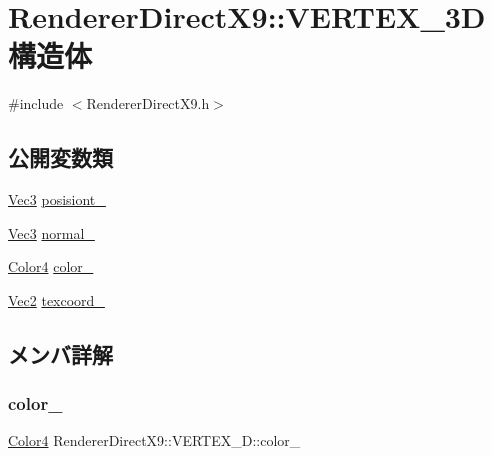 \hypertarget{struct_renderer_direct_x9_1_1_v_e_r_t_e_x__3_d}{}\section{Renderer\+Direct\+X9\+:\+:V\+E\+R\+T\+E\+X\+\_\+3D 構造体}
\label{struct_renderer_direct_x9_1_1_v_e_r_t_e_x__3_d}


{\ttfamily \#include $<$Renderer\+Direct\+X9.\+h$>$}

\subsection*{公開変数類}
\begin{DoxyCompactItemize}
\item 
\mbox{\hyperlink{_vector3_d_8h_ab16f59e4393f29a01ec8b9bbbabbe65d}{Vec3}} \mbox{\hyperlink{struct_renderer_direct_x9_1_1_v_e_r_t_e_x__3_d_a15e30709ae06aa5bc8e73054e9f160e9}{posisiont\+\_\+}}
\item 
\mbox{\hyperlink{_vector3_d_8h_ab16f59e4393f29a01ec8b9bbbabbe65d}{Vec3}} \mbox{\hyperlink{struct_renderer_direct_x9_1_1_v_e_r_t_e_x__3_d_a14a5a2f215062bb76fc69daa45160904}{normal\+\_\+}}
\item 
\mbox{\hyperlink{_vector3_d_8h_a9c2339f516cf07ce4753b8a99fab3791}{Color4}} \mbox{\hyperlink{struct_renderer_direct_x9_1_1_v_e_r_t_e_x__3_d_ac81f0059a82d7005a8bd3cfb189cb277}{color\+\_\+}}
\item 
\mbox{\hyperlink{_vector3_d_8h_a5ef6e95dfc5f9d3820b71772d99bbc25}{Vec2}} \mbox{\hyperlink{struct_renderer_direct_x9_1_1_v_e_r_t_e_x__3_d_a240251febb14de7b0a6525d3b305f516}{texcoord\+\_\+}}
\end{DoxyCompactItemize}


\subsection{メンバ詳解}
\mbox{\label{struct_renderer_direct_x9_1_1_v_e_r_t_e_x__3_d_ac81f0059a82d7005a8bd3cfb189cb277}} 
\subsubsection{\texorpdfstring{color\+\_\+}{color\_}}
{\footnotesize\ttfamily \mbox{\hyperlink{_vector3_d_8h_a9c2339f516cf07ce4753b8a99fab3791}{Color4}} Renderer\+Direct\+X9\+::\+V\+E\+R\+T\+E\+X\+\_\+D\+::color\+\_\+}

